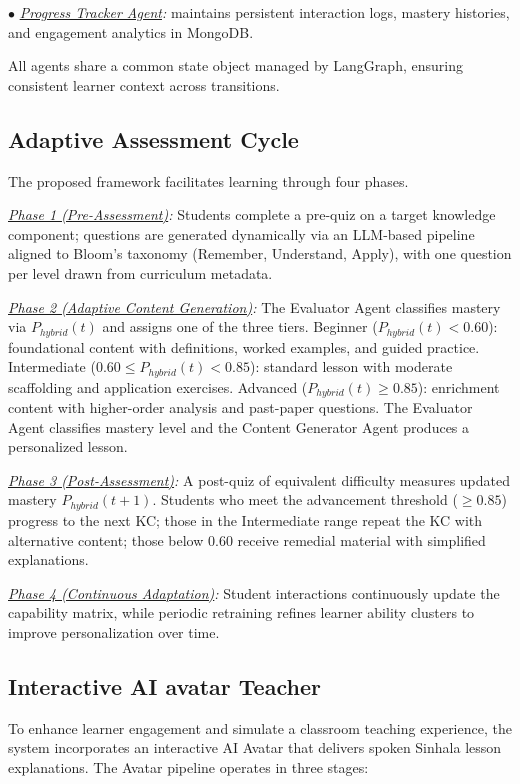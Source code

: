 \documentclass[conference]{IEEEtran}
\begin{document}
$\bullet$ \textit{\underline{Progress Tracker Agent}:} maintains persistent interaction logs, mastery histories, and engagement analytics in MongoDB.

All agents share a common state object managed by LangGraph, ensuring consistent learner context across transitions.

\subsection{Adaptive Assessment Cycle}
The proposed framework facilitates learning through four phases.

\textit{\underline{Phase 1 (Pre-Assessment)}:} Students complete a pre-quiz on a target knowledge component; questions are generated dynamically via an LLM-based pipeline aligned to Bloom's taxonomy (Remember, Understand, Apply), with one question per level drawn from curriculum metadata.

\textit{\underline{Phase 2 (Adaptive Content Generation)}:} The Evaluator Agent classifies mastery via $P_{hybrid}(t)$ and assigns one of the three tiers. Beginner ($P_{hybrid}(t) < 0.60$): foundational content with definitions, worked examples, and guided practice. Intermediate ($0.60 \le P_{hybrid}(t) < 0.85$): standard lesson with moderate scaffolding and application exercises. Advanced ($P_{hybrid}(t) \ge 0.85$): enrichment content with higher-order analysis and past-paper questions. The Evaluator Agent classifies mastery level and the Content Generator Agent produces a personalized lesson.

\textit{\underline{Phase 3 (Post-Assessment)}:} A post-quiz of equivalent difficulty measures updated mastery $P_{hybrid}(t+1)$. Students who meet the advancement threshold ($\ge 0.85$) progress to the next KC; those in the Intermediate range repeat the KC with alternative content; those below $0.60$ receive remedial material with simplified explanations.

\textit{\underline{Phase 4 (Continuous Adaptation)}:} Student interactions continuously update the capability matrix, while periodic retraining refines learner ability clusters to improve personalization over time.

\subsection{Interactive AI avatar Teacher}
To enhance learner engagement and simulate a classroom teaching experience, the system incorporates an interactive AI Avatar that delivers spoken Sinhala lesson explanations. The Avatar pipeline operates in three stages:
\end{document}
